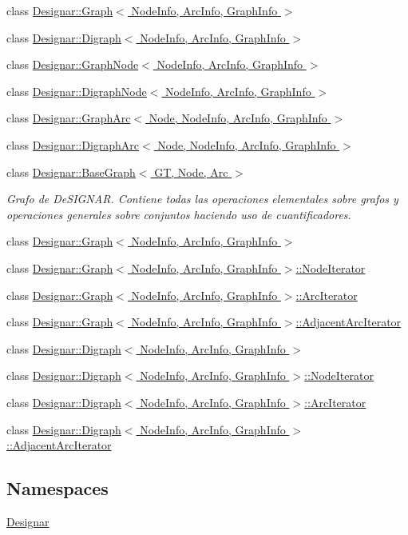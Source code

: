 \begin{DoxyCompactItemize}
\item 
class \hyperlink{class_designar_1_1_graph}{Designar\+::\+Graph$<$ Node\+Info, Arc\+Info, Graph\+Info $>$}
\item 
class \hyperlink{class_designar_1_1_digraph}{Designar\+::\+Digraph$<$ Node\+Info, Arc\+Info, Graph\+Info $>$}
\item 
class \hyperlink{class_designar_1_1_graph_node}{Designar\+::\+Graph\+Node$<$ Node\+Info, Arc\+Info, Graph\+Info $>$}
\item 
class \hyperlink{class_designar_1_1_digraph_node}{Designar\+::\+Digraph\+Node$<$ Node\+Info, Arc\+Info, Graph\+Info $>$}
\item 
class \hyperlink{class_designar_1_1_graph_arc}{Designar\+::\+Graph\+Arc$<$ Node, Node\+Info, Arc\+Info, Graph\+Info $>$}
\item 
class \hyperlink{class_designar_1_1_digraph_arc}{Designar\+::\+Digraph\+Arc$<$ Node, Node\+Info, Arc\+Info, Graph\+Info $>$}
\item 
class \hyperlink{class_designar_1_1_base_graph}{Designar\+::\+Base\+Graph$<$ G\+T, Node, Arc $>$}
\begin{DoxyCompactList}\small\item\em Grafo de De\+S\+I\+G\+N\+AR. Contiene todas las operaciones elementales sobre grafos y operaciones generales sobre conjuntos haciendo uso de cuantificadores. \end{DoxyCompactList}\item 
class \hyperlink{class_designar_1_1_graph}{Designar\+::\+Graph$<$ Node\+Info, Arc\+Info, Graph\+Info $>$}
\item 
class \hyperlink{class_designar_1_1_graph_1_1_node_iterator}{Designar\+::\+Graph$<$ Node\+Info, Arc\+Info, Graph\+Info $>$\+::\+Node\+Iterator}
\item 
class \hyperlink{class_designar_1_1_graph_1_1_arc_iterator}{Designar\+::\+Graph$<$ Node\+Info, Arc\+Info, Graph\+Info $>$\+::\+Arc\+Iterator}
\item 
class \hyperlink{class_designar_1_1_graph_1_1_adjacent_arc_iterator}{Designar\+::\+Graph$<$ Node\+Info, Arc\+Info, Graph\+Info $>$\+::\+Adjacent\+Arc\+Iterator}
\item 
class \hyperlink{class_designar_1_1_digraph}{Designar\+::\+Digraph$<$ Node\+Info, Arc\+Info, Graph\+Info $>$}
\item 
class \hyperlink{class_designar_1_1_digraph_1_1_node_iterator}{Designar\+::\+Digraph$<$ Node\+Info, Arc\+Info, Graph\+Info $>$\+::\+Node\+Iterator}
\item 
class \hyperlink{class_designar_1_1_digraph_1_1_arc_iterator}{Designar\+::\+Digraph$<$ Node\+Info, Arc\+Info, Graph\+Info $>$\+::\+Arc\+Iterator}
\item 
class \hyperlink{class_designar_1_1_digraph_1_1_adjacent_arc_iterator}{Designar\+::\+Digraph$<$ Node\+Info, Arc\+Info, Graph\+Info $>$\+::\+Adjacent\+Arc\+Iterator}
\end{DoxyCompactItemize}
\subsection*{Namespaces}
\begin{DoxyCompactItemize}
\item 
 \hyperlink{namespace_designar}{Designar}
\end{DoxyCompactItemize}

